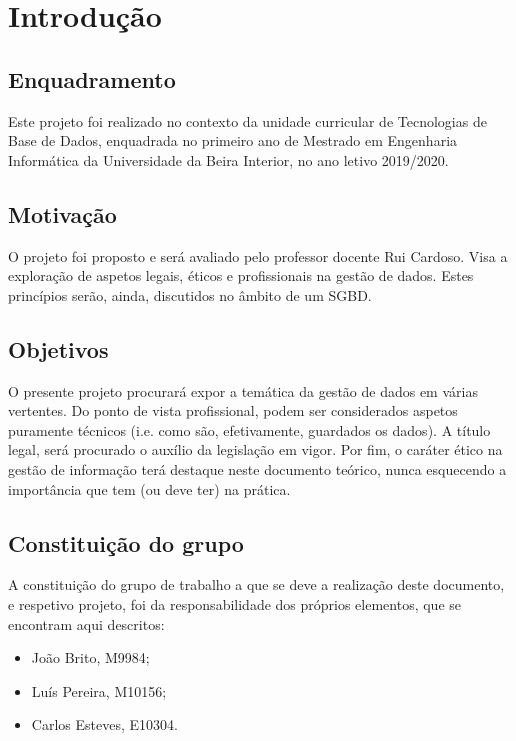 \setlength{\parskip}{1em}
\setlength{\parindent}{0pt}

\chapter{Introdução}
\label{chap:intro}

\section{Enquadramento}
\label{sec:amb}

Este projeto foi realizado no contexto da unidade curricular de Tecnologias de Base de Dados, enquadrada no primeiro ano de Mestrado em Engenharia Informática da Universidade da Beira Interior, no ano letivo 2019/2020.

\section{Motivação}
\label{sec:mot}

O projeto foi proposto e será avaliado pelo professor docente Rui Cardoso. Visa a exploração de aspetos legais, éticos e profissionais na gestão de dados. Estes princípios serão, ainda, discutidos no âmbito de um \ac{SGBD}.

\section{Objetivos}
\label{sec:obj}
O presente projeto procurará expor a temática da gestão de dados em várias vertentes. Do ponto de vista profissional, podem ser considerados aspetos puramente técnicos (i.e. como são, efetivamente, guardados os dados). A título legal, será procurado o auxílio da legislação em vigor. Por fim, o caráter ético na gestão de informação terá destaque neste documento teórico, nunca esquecendo a importância que tem (ou deve ter) na prática.


\section{Constituição do grupo}
\label{sec:const_grupo}
A constituição do grupo de trabalho a que se deve a realização deste documento, e respetivo projeto, foi da responsabilidade dos próprios elementos, que se encontram aqui descritos:
\begin{itemize}
    \item João Brito, M9984;
    \item Luís Pereira, M10156;
    \item Carlos Esteves, E10304.
\end{itemize}

